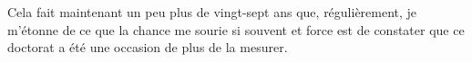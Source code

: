 

%
%
%
%
%
%
%

Cela fait maintenant un peu plus de vingt-sept ans que, régulièrement, 
je m'étonne de ce que la chance me sourie si souvent et
force est de constater que ce doctorat a été une occasion de plus de la mesurer.

